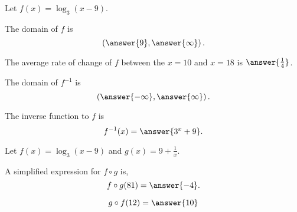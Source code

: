 \documentclass{ximera}
\author{Nela Lakos \and Kyle Parsons}
\begin{document}
\begin{exercise}

Let $\displaystyle{f(x) = \log_3(x-9)}$.

The domain of $f$ is
\[
\left(\answer{9},\answer{\infty}\right).
\]

The average rate of change of $f$ between the $x=10$ and $x=18$ is $\answer{\frac{1}{4}}$.

The domain of $f^{-1}$ is
\[
\left(\answer{-\infty},\answer{\infty}\right).
\]

The inverse function to $f$ is 
\[
f^{-1}(x) = \answer{3^x + 9}.
\]

\begin{exercise}

Let $f(x) = \log_3(x-9)$ and $g(x) = 9 + \frac{1}{x}$.

A simplified expression for $f\circ g$ is,
\[
f\circ g(81) = \answer{-4}.
\]

\[
g\circ f(12) = \answer{10}
\]

\end{exercise}
\end{exercise}
\end{document}
